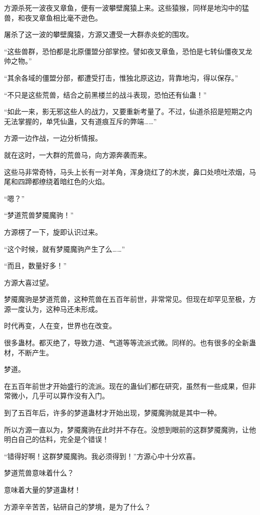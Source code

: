 
\begin{this_body}

方源杀死一波夜叉章鱼，便有一波攀壁魔猿上来。这些猿猴，同样是地沟中的猛兽，和夜叉章鱼相比毫不逊色。

屠杀了这一波的攀壁魔猿，方源又遭受一大群赤炎蛇的围攻。

“这些兽群，恐怕都是北原僵盟分部掌控。譬如夜叉章鱼，恐怕是七转仙僵夜叉龙帅之物。”

“其余各域的僵盟分部，都遭受打击，惟独北原这边，背靠地沟，得以保存。”

“不只是这些荒兽，结合之前黑楼兰的战斗表现，恐怕还有仙蛊！”

“如此一来，影无邪这些人的战力，又要重新考量了。不过，仙道杀招是短期之内无法掌握的，单凭仙蛊，又有道痕互斥的弊端……”

方源一边作战，一边分析情报。

就在这时，一大群的荒兽马，向方源奔袭而来。

这些马非常奇特，马头上长有一对羊角，浑身烧红了的木炭，鼻口处喷吐浓烟，马尾和四蹄都缭绕着暗红色的火焰。

“嗯？”

“梦道荒兽梦魇魔驹！”

方源楞了一下，旋即认识过来。

“这个时候，就有梦魇魔驹产生了么……”

“而且，数量好多！”

方源大喜过望。

梦魇魔驹是梦道荒兽，这种荒兽在五百年前世，非常常见。但现在却罕见至极，方源一度认为，这种马还未形成。

时代再变，人在变，世界也在改变。

很多蛊材。都灭绝了，导致力道、气道等等流派式微。同样的。也有很多的全新蛊材，不断产生。

梦道。

在五百年前世才开始盛行的流派。现在的蛊仙们都在研究，虽然有一些成果，但非常微小，几乎可以算作没有入门。

到了五百年后，许多的梦道蛊材才开始出现，梦魇魔驹就是其中一种。

所以方源一直以为，梦魇魔驹在此时并不存在。没想到眼前的这群梦魇魔驹，让他明白自己的估料，完全是个错误！

“错得好啊！这群梦魇魔驹。我必须得到！”方源心中十分欢喜。

梦道荒兽意味着什么？

意味着大量的梦道蛊材！

方源辛辛苦苦，钻研自己的梦境，是为了什么？


\end{this_body}

